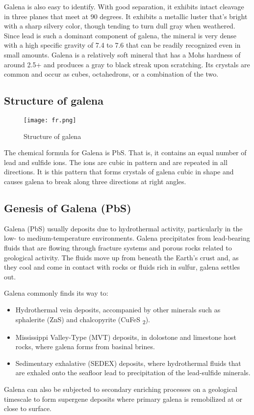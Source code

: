 \documentclass[12pt,a4paper, top=1.9cm, bottom=2.03cm, left=3.81cm, right=1.9cm]{article}
\begin{document}
\noindent\fontsize{12}{14}\selectfont Galena is also easy to identify. With good separation, it exhibits intact cleavage in three planes that meet at 90 degrees. It exhibits a metallic luster that's bright with a sharp silvery color, though tending to turn dull gray when weathered. Since lead is such a dominant component of galena, the mineral is very dense with a high specific gravity of 7.4 to 7.6 that can be readily recognized even in small amounts. Galena is a relatively soft mineral that has a Mohs hardness of around 2.5+ and produces a gray to black streak upon scratching. Its crystals are common and occur as cubes, octahedrons, or a combination of the two.
\subsection{Structure of galena}
\begin{figure}[h!]
        \centering
\texttt{[image: fr.png]}  %
        \caption{Structure of galena}
    \end{figure}

\noindent\fontsize{12}{14}\selectfont The chemical formula for Galena is PbS. That is, it contains an equal number of lead and sulfide ions. The ions are cubic in pattern and are repeated in all directions. It is this pattern that forms crystals of galena cubic in shape and causes galena to break along three directions at right angles.
\subsection{Genesis of Galena (PbS)}
\noindent\fontsize{12}{14}\selectfont Galena (PbS) usually deposits due to hydrothermal activity, particularly in the low- to medium-temperature environments. Galena precipitates from lead-bearing fluids that are flowing through fracture systems and porous rocks related to geological activity. The fluids move up from beneath the Earth's crust and, as they cool and come in contact with rocks or fluids rich in sulfur, galena settles out.

\noindent\fontsize{12}{14}\selectfont Galena commonly finds its way to:
\begin{itemize}[label=\textbullet]  %
\item Hydrothermal vein deposits, accompanied by other minerals such as sphalerite (ZnS) and chalcopyrite (CuFeS \textsubscript{2}).
\item Mississippi Valley-Type (MVT) deposits, in dolostone and limestone host rocks, where galena forms from basinal brines.
\item Sedimentary exhalative (SEDEX) deposits, where hydrothermal fluids that are exhaled onto the seafloor lead to precipitation of the lead-sulfide minerals.
\end{itemize}
\noindent\fontsize{12}{14}\selectfont Galena can also be subjected to secondary enriching processes on a geological timescale to form supergene deposits where primary galena is remobilized at or close to surface.
\newpage
\end{document}
